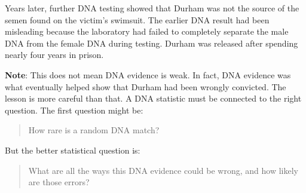\documentclass[
  letterpaper,
  DIV=11,
  numbers=noendperiod]{scrreprt}
\begin{document}
\begin{tcolorbox}
Years later, further DNA testing showed that Durham was not the source
of the semen found on the victim's swimsuit. The earlier DNA result had
been misleading because the laboratory had failed to completely separate
the male DNA from the female DNA during testing. Durham was released
after spending nearly four years in prison.

\textbf{Note}: This does not mean DNA evidence is weak. In fact, DNA
evidence was what eventually helped show that Durham had been wrongly
convicted. The lesson is more careful than that. A DNA statistic must be
connected to the right question. The first question might be:

\begin{quote}
How rare is a random DNA match?
\end{quote}

But the better statistical question is:

\begin{quote}
What are all the ways this DNA evidence could be wrong, and how likely
are those errors?
\end{quote}

\end{tcolorbox}
\end{document}
